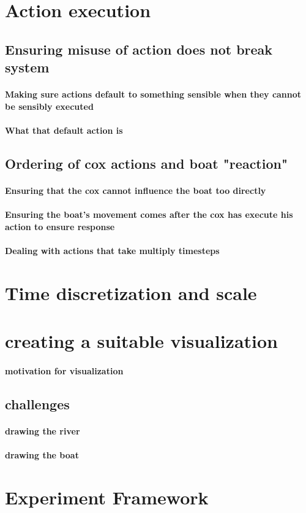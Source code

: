   \section{Action execution}
    \subsection{Ensuring misuse of action does not break system}
      \paragraph{Making sure actions default to something sensible when they cannot be sensibly executed}
      \paragraph{What that default action is}
      
    \subsection{Ordering of cox actions and boat "reaction"}
      \paragraph{Ensuring that the cox cannot influence the boat too directly}
      \paragraph{Ensuring the boat's movement comes after the cox has execute his action to ensure response}
      \paragraph{Dealing with actions that take multiply timesteps}
      
  \section{Time discretization and scale}
    
    
  \section{creating a suitable visualization}
    \paragraph{motivation for visualization}
    \subsection{challenges}
      \paragraph{drawing the river}
      \paragraph{drawing the boat}
      
  \section{Experiment Framework}